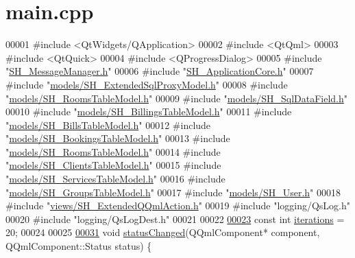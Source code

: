 \hypertarget{main_8cpp_source}{\section{main.\-cpp}
}

\begin{DoxyCode}
00001 \textcolor{preprocessor}{#include <QtWidgets/QApplication>}
00002 \textcolor{preprocessor}{#include <QtQml>}
00003 \textcolor{preprocessor}{#include <QtQuick>}
00004 \textcolor{preprocessor}{#include <QProgressDialog>}
00005 \textcolor{preprocessor}{#include "\hyperlink{SH__MessageManager_8h}{SH\_MessageManager.h}"}
00006 \textcolor{preprocessor}{#include "\hyperlink{SH__ApplicationCore_8h}{SH\_ApplicationCore.h}"}
00007 \textcolor{preprocessor}{#include "\hyperlink{SH__ExtendedSqlProxyModel_8h}{models/SH\_ExtendedSqlProxyModel.h}"}
00008 \textcolor{preprocessor}{#include "\hyperlink{SH__RoomsTableModel_8h}{models/SH\_RoomsTableModel.h}"}
00009 \textcolor{preprocessor}{#include "\hyperlink{SH__SqlDataField_8h}{models/SH\_SqlDataField.h}"}
00010 \textcolor{preprocessor}{#include "\hyperlink{SH__BillingsTableModel_8h}{models/SH\_BillingsTableModel.h}"}
00011 \textcolor{preprocessor}{#include "\hyperlink{SH__BillsTableModel_8h}{models/SH\_BillsTableModel.h}"}
00012 \textcolor{preprocessor}{#include "\hyperlink{SH__BookingsTableModel_8h}{models/SH\_BookingsTableModel.h}"}
00013 \textcolor{preprocessor}{#include "\hyperlink{SH__RoomsTableModel_8h}{models/SH\_RoomsTableModel.h}"}
00014 \textcolor{preprocessor}{#include "\hyperlink{SH__ClientsTableModel_8h}{models/SH\_ClientsTableModel.h}"}
00015 \textcolor{preprocessor}{#include "\hyperlink{SH__ServicesTableModel_8h}{models/SH\_ServicesTableModel.h}"}
00016 \textcolor{preprocessor}{#include "\hyperlink{SH__GroupsTableModel_8h}{models/SH\_GroupsTableModel.h}"}
00017 \textcolor{preprocessor}{#include "\hyperlink{SH__User_8h}{models/SH\_User.h}"}
00018 \textcolor{preprocessor}{#include "\hyperlink{SH__ExtendedQQmlAction_8h}{views/SH\_ExtendedQQmlAction.h}"}
00019 \textcolor{preprocessor}{#include "logging/QsLog.h"}
00020 \textcolor{preprocessor}{#include "logging/QsLogDest.h"}
00021 
00022 
\hypertarget{main_8cpp_source_l00023}{}\hyperlink{main_8cpp_aab83ac6564fd72e82c62b21733ca0e1b}{00023} \textcolor{keyword}{const} \textcolor{keywordtype}{int} \hyperlink{main_8cpp_aab83ac6564fd72e82c62b21733ca0e1b}{iterations} = 20;
00024 
00025 
\hypertarget{main_8cpp_source_l00031}{}\hyperlink{main_8cpp_aaf7c4666a49fc2890c12b6ae393b8deb}{00031} \textcolor{keywordtype}{void} \hyperlink{main_8cpp_aaf7c4666a49fc2890c12b6ae393b8deb}{statusChanged}(QQmlComponent* component, QQmlComponent::Status status) \{

\end{DoxyCode}
